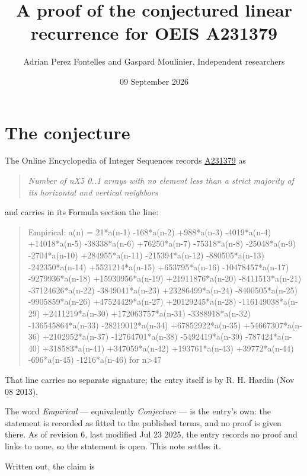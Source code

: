\documentclass[11pt]{article}
\title{A proof of the conjectured linear recurrence for OEIS A231379}
\author{Adrian Perez Fontelles and Gaspard Moulinier, Independent researchers}
\date{09 September 2026}
\theoremstyle{definition}
\begin{document}
\maketitle
\section{The conjecture}

The Online Encyclopedia of Integer Sequences records \href{https://oeis.org/A231379}{A231379} as

\begin{quote}\itshape Number of nX5 0..1 arrays with no element less than a strict majority of its horizontal and vertical neighbors\end{quote}

and carries in its Formula section the line:

\begin{quote}\ttfamily Empirical: a(n) = 21*a(n-1) -168*a(n-2) +988*a(n-3) -4019*a(n-4) +14018*a(n-5) -38338*a(n-6) +76250*a(n-7) -75318*a(n-8) -25048*a(n-9) -2704*a(n-10) +284955*a(n-11) -215394*a(n-12) -880505*a(n-13) -242350*a(n-14) +5521214*a(n-15) +653795*a(n-16) -10478457*a(n-17) -9279936*a(n-18) +15930956*a(n-19) +21911876*a(n-20) -8411513*a(n-21) -37124626*a(n-22) -3849041*a(n-23) +23286499*a(n-24) -8400505*a(n-25) -9905859*a(n-26) +47524429*a(n-27) +20129245*a(n-28) -116149038*a(n-29) +2411219*a(n-30) +172063757*a(n-31) -3388918*a(n-32) -136545864*a(n-33) -28219012*a(n-34) +67852922*a(n-35) +54667307*a(n-36) +2102952*a(n-37) -12764701*a(n-38) -5492419*a(n-39) -787424*a(n-40) +318583*a(n-41) +347059*a(n-42) +193761*a(n-43) +39772*a(n-44) -696*a(n-45) -1216*a(n-46) for n>47\end{quote}

That line carries no separate signature; the entry itself is by R. H. Hardin (Nov 08 2013).

The word {\itshape Empirical} --- equivalently {\itshape Conjecture} --- is the entry's own: the statement is recorded as fitted to the published terms, and no proof is given there. As of revision 6, last modified Jul 23 2025, the entry records no proof and links to none, so the statement is open. This note settles it.

Written out, the claim is
\end{document}

